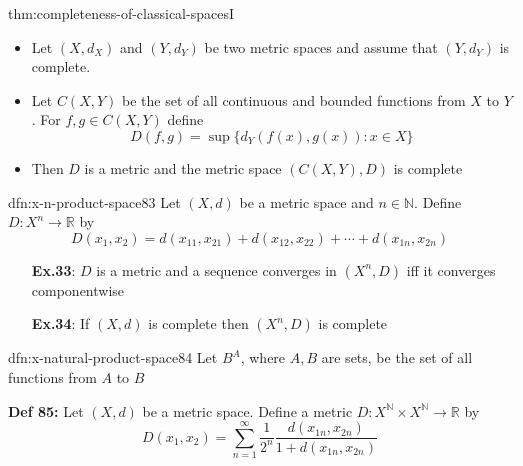 \documentclass[landscape, 8pt]{extarticle}
\begin{document}
\begin{multicols}{3}
\begin{thm}{thm:completeness-of-classical-spaces}{I}
    \vspace{-3pt}
    \vspace{-8pt}

    \begin{itemize}[leftmargin=*]
        \item Let $(X, d_{X})$ and $(Y, d_{Y})$ be two metric spaces and assume that $(Y, d_{Y})$ is complete.
        \item Let $C(X, Y)$ be the set of all continuous and bounded functions from $X$ to $Y$. For $f, g\in C(X, Y)$ define
            \[D(f, g) = \sup \{d_{Y}(f(x), g(x)) : x\in X\}\]
        \item Then $D$ is a metric and the metric space $(C(X, Y), D)$ is complete
    \end{itemize}
\end{thm}

\vspace{-5pt}
\begin{dfn}{dfn:x-n-product-space}{83}
    \vspace{-5pt}
    Let $(X, d)$ be a metric space and $n\in \mathbb{N}$. Define $D : X^{n} \to \mathbb{R}$ by
    \[D(x_{1}, x_{2}) = d(x_{11}, x_{21}) + d(x_{12}, x_{22}) + \cdots + d(x_{1n}, x_{2n})\]

    \vspace{-5pt}

    \vspace{-8pt}
    \begin{itemize}
        \item[\textbf{Ex.33}:] $D$ is a metric and a sequence converges in $(X^{n}, D)$ iff it \newline converges componentwise
        \item[\textbf{Ex.34}:] If $(X, d)$ is complete then $(X^{n}, D)$ is complete
    \end{itemize}
\end{dfn}

\vspace{-5pt}
\begin{dfn}{dfn:x-natural-product-space}{84}
    \vspace{-5pt}
    Let $B^{A}$, where $A, B$ are sets, be the set of all functions from $A$ to $B$

    \longrule{0.08ex}
    \textbf{Def 85:} Let $(X, d)$ be a metric space. Define a metric $D : X^{\mathbb{N}} \times X^{\mathbb{N}} \to \mathbb{R}$ by
    \[D(x_{1}, x_{2}) = \sum_{n = 1}^{\infty} \frac{1}{2^{n}} \frac{d(x_{1n}, x_{2n})}{1 + d(x_{1n}, x_{2n})}\]


\end{dfn}
\end{multicols}
\end{document}
